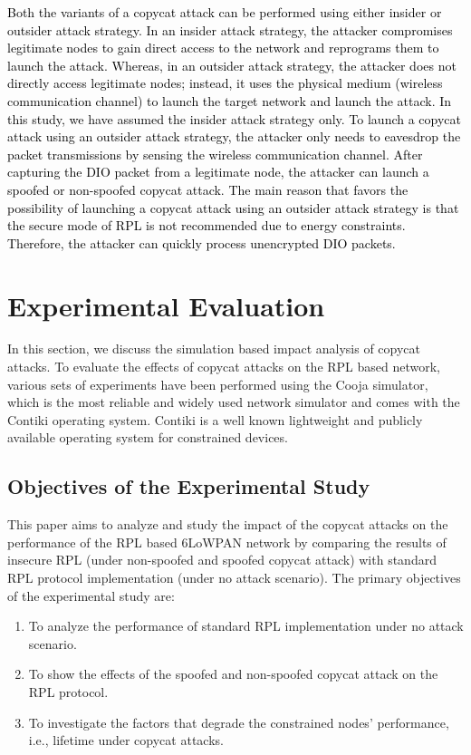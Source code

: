 \documentclass[]{svjour3}                     %
\begin{document}
\textcolor{black}{Both the variants of a copycat attack can be performed using either insider or outsider attack strategy. In an insider attack strategy, the attacker compromises legitimate nodes to gain direct access to the network and reprograms them to launch the attack. Whereas, in an outsider attack strategy, the attacker does not directly access legitimate nodes; instead, it uses the physical medium (wireless communication channel) to launch the target network and launch the attack. In this study, we have assumed the insider attack strategy only. To launch a copycat attack using an outsider attack strategy, the attacker only needs to eavesdrop the packet transmissions by sensing the wireless communication channel. After capturing the DIO packet from a legitimate node, the attacker can launch a spoofed or non-spoofed copycat attack. The main reason that favors the possibility of launching a copycat attack using an outsider attack strategy is that the secure mode of RPL is not recommended due to energy constraints. Therefore, the attacker can quickly process unencrypted DIO packets.} 






\section{Experimental Evaluation} \label{Experimental Evalutaion}
In this section, we discuss the simulation based impact analysis of copycat attacks. To evaluate the effects of copycat attacks on the RPL based network, various sets of experiments have been performed using the Cooja simulator, which is the most reliable and widely used network simulator and comes with the Contiki operating system. Contiki is a well known lightweight and publicly available operating system for constrained devices.     

\subsection{Objectives of the Experimental Study}
This paper aims to analyze and study the impact of the copycat attacks on the performance of the RPL based 6LoWPAN network by comparing the results of insecure RPL (under non-spoofed and spoofed copycat attack) with standard RPL protocol implementation (under no attack scenario). The primary objectives of the experimental study are:

\begin{enumerate}
	\item To analyze the performance of standard RPL implementation under no attack scenario.
	\item To show the effects of the spoofed and non-spoofed copycat attack on the RPL protocol.
	\item To investigate the factors that degrade the constrained nodes' performance, i.e., lifetime under copycat attacks.   
\end{enumerate}
\end{document}
